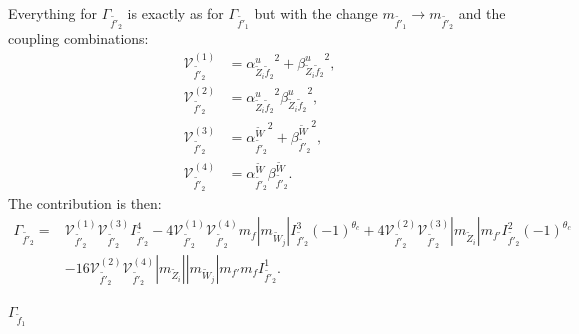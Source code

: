 \documentclass[final,3p,times,pdflatex]{elsarticle}
\begin{document}
Everything for $\Gamma_{\tilde{f'}_2}$ is exactly as for $\Gamma_{\tilde{f'}_1}$ but with the change $m_{\tilde{f'}_1} \rightarrow m_{\tilde{f'}_2}$ and the coupling combinations:
\begin{align}
\mathcal{V}_{\tilde{f'}_2}^{(1)} &= {\alpha_{\tilde{Z}_i \tilde{f}_2}^{u}}^2 + {\beta_{\tilde{Z}_i \tilde{f}_2}^{u}}^2, \\
\mathcal{V}_{\tilde{f'}_2}^{(2)} &= {\alpha_{\tilde{Z}_i \tilde{f}_2}^{u}}^2 {\beta_{\tilde{Z}_i \tilde{f}_2}^{u}}^2 , \\
\mathcal{V}_{\tilde{f'}_2}^{(3)} &= {\alpha_{\tilde{f'}_2}^{\tilde{W}}}^2 + {\beta_{\tilde{f'}_2}^{\tilde{W}}}^2, \\
\mathcal{V}_{\tilde{f'}_2}^{(4)} &= \alpha_{\tilde{f'}_2}^{\tilde{W}} \beta_{\tilde{f'}_2}^{\tilde{W}}.
\end{align}
The contribution is then:
\begin{equation}
\begin{aligned}
\Gamma_{\tilde{f'}_2} = & \mathcal{V}_{\tilde{f'}_2}^{(1)} \mathcal{V}_{\tilde{f'}_2}^{(3)} I_{\tilde{f'}_2}^{4} - 4 \mathcal{V}_{\tilde{f'}_2}^{(1)} \mathcal{V}_{\tilde{f'}_2}^{(4)} m_{f}|m_{\tilde{W}_j}| I_{\tilde{f'}_2}^{3}(-1)^{\theta_c} + 4 \mathcal{V}_{\tilde{f'}_2}^{(2)} \mathcal{V}_{\tilde{f'}_2}^{(3)} |m_{\tilde{Z}_i}|m_{f'} I_{\tilde{f'}_2}^{2} (-1)^{\theta_c} \\ & - 16 \mathcal{V}_{\tilde{f'}_2}^{(2)} \mathcal{V}_{\tilde{f'}_2}^{(4)} |m_{\tilde{Z}_i}||m_{\tilde{W}_j}|m_{f'}m_{f} I_{\tilde{f'}_2}^{1}.
\end{aligned}
\end{equation}

\textbf{\underline{$\Gamma_{\tilde{f}_1}$}}
\end{document}
